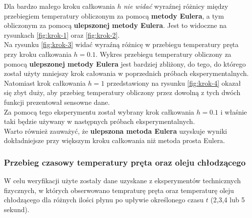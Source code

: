 \documentclass[
	12pt, %
]{fphw}
\begin{document}
Dla bardzo małego kroku całkowania \(h\) \textit{nie widać} wyraźnej różnicy między przebiegiem temperatury
obliczonym za pomocą \textbf{metody Eulera}, a tym obliczonym za pomocą \textbf{ulepszonej metody Eulera}.
Jest to widoczne na rysunkach \ref{fig:krok-1} oraz \ref{fig:krok-2}.\\
Na rysunku \ref{fig:krok-3} widać wyraźną różnicę w przebiegu temperatury pręta przy kroku całkowania \(h = 0.1\).
Wykres przebiegu temperatury obliczony za pomocą \textbf{ulepszonej metody Eulera} jest bardziej zbliżony,
do tego, do którego został użyty mniejszy krok całowania w poprzednich próbach eksperymentalnych. \\
Natomiast krok całkowania \(h = 1\) przedstawiony na rysunku \ref{fig:krok-4} okazał się zbyt duży,
aby przebieg temperatury obliczony przez dowolną z tych dwóch funkcji prezentował sensowne dane. \\
Za pomocą tego eksperymentu został wybrany krok całkowania \(h = 0.1\) i właśnie taki będzie używany
w następnych próbach eksperymentalnych. \\
Warto również zauważyć, że \textbf{ulepszona metoda Eulera} uzyskuje wyniki dokładniejsze
przy większym kroku całkowania niż metoda prosta Eulera.

\newpage

\subsubsection{Przebieg czasowy temperatury pręta oraz oleju chłodzącego}

W celu weryfikacji użyte zostały dane uzyskane z eksperymentów technicznych
fizycznych, w których obserwowano tempraturę pręta oraz temperaturę oleju chłodzącego
dla różnych ilości płynu po upływie określonego czasu \(t\) (2,3,4 lub 5 sekund).
\end{document}
